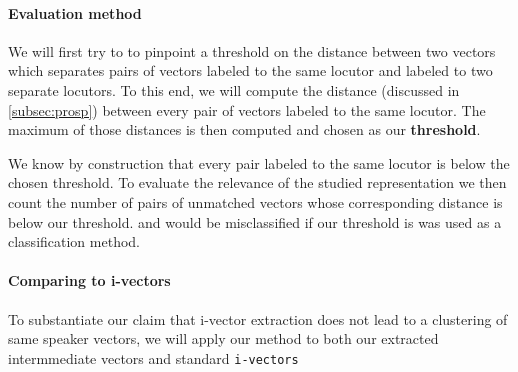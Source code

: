 \documentclass[conference]{IEEEtran}
\begin{document}
\paragraph{Evaluation method}

We will first try to to pinpoint a threshold on the distance
between two vectors which separates pairs of vectors labeled to the same locutor
and labeled to two separate locutors. To this end, we will compute the distance
(discussed in \ref{subsec:prosp}) between every pair of vectors labeled to the
same locutor. The maximum of those distances is then computed and chosen as our
\textbf{threshold}.

We know by construction that every pair labeled to the same locutor is below the
chosen threshold. To evaluate the relevance of the studied representation we
then count the number of pairs of unmatched vectors whose corresponding distance
is below our threshold. and would be misclassified if our threshold is was used
as a classification method.

\paragraph{Comparing to i-vectors}

 To substantiate our claim that i-vector extraction does not lead to a
 clustering of same speaker vectors, we will apply our method to both our
 extracted intermmediate vectors and standard \texttt{i-vectors}






\appendix

\printbibliography
\end{document}
